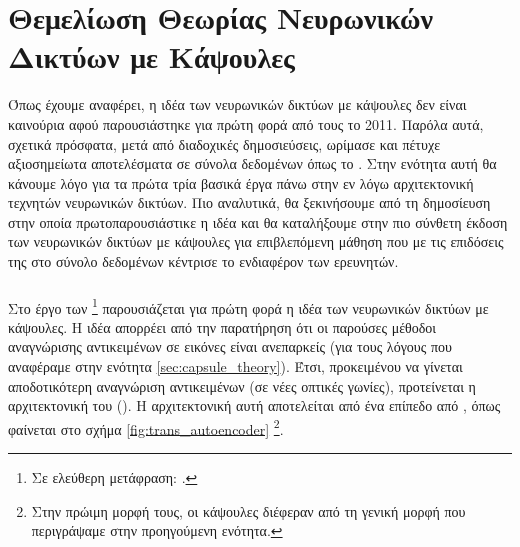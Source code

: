 \section{Θεμελίωση Θεωρίας Νευρωνικών Δικτύων με Κάψουλες}

Όπως έχουμε αναφέρει, η ιδέα των νευρωνικών δικτύων με κάψουλες δεν είναι καινούρια αφού παρουσιάστηκε για πρώτη φορά από τους  το 2011. Παρόλα αυτά, σχετικά πρόσφατα, μετά από διαδοχικές δημοσιεύσεις, ωρίμασε και πέτυχε αξιοσημείωτα αποτελέσματα σε σύνολα δεδομένων όπως το \cite{sabour2017dynamic}. Στην ενότητα αυτή θα κάνουμε λόγο για τα πρώτα τρία βασικά έργα πάνω στην εν λόγω αρχιτεκτονική τεχνητών νευρωνικών δικτύων. Πιο αναλυτικά, θα ξεκινήσουμε από τη δημοσίευση στην οποία πρωτοπαρουσιάστικε η ιδέα και θα καταλήξουμε στην πιο σύνθετη έκδοση των νευρωνικών δικτύων με κάψουλες για επιβλεπόμενη μάθηση που με τις επιδόσεις της στο σύνολο δεδομένων \cite{lecun2004learning} κέντρισε το ενδιαφέρον των ερευνητών. 

\subsubsection{}

Στο έργο των \footnote{Σε ελεύθερη μετάφραση: .} \cite{hinton2011transforming} παρουσιάζεται για πρώτη φορά η ιδέα των νευρωνικών δικτύων με κάψουλες. Η ιδέα απορρέει από την παρατήρηση ότι οι παρούσες μέθοδοι αναγνώρισης αντικειμένων σε εικόνες είναι ανεπαρκείς (για τους λόγους που αναφέραμε στην ενότητα \ref{sec:capsule_theory}). Έτσι, προκειμένου να γίνεται αποδοτικότερη αναγνώριση αντικειμένων (σε νέες οπτικές γωνίες), προτείνεται η αρχιτεκτονική του  (). Η αρχιτεκτονική αυτή αποτελείται από ένα επίπεδο από , όπως φαίνεται στο σχήμα \ref{fig:trans_autoencoder} \footnote{Στην πρώιμη μορφή τους, οι κάψουλες διέφεραν από τη γενική μορφή που περιγράψαμε στην προηγούμενη ενότητα.}.\par

